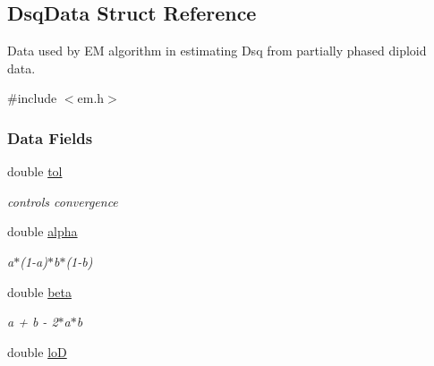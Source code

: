 \hypertarget{struct_dsq_data}{\subsection{\-Dsq\-Data \-Struct \-Reference}
\label{struct_dsq_data}
}


\-Data used by \-E\-M algorithm in estimating \-Dsq from partially phased diploid data.  




{\ttfamily \#include $<$em.\-h$>$}

\subsubsection*{\-Data \-Fields}
\begin{DoxyCompactItemize}
\item 
\hypertarget{struct_dsq_data_a2817fb4b70921ae3a9722c1fbf0f4a58}{double \hyperlink{struct_dsq_data_a2817fb4b70921ae3a9722c1fbf0f4a58}{tol}}\label{struct_dsq_data_a2817fb4b70921ae3a9722c1fbf0f4a58}

\begin{DoxyCompactList}\small\item\em controls convergence \end{DoxyCompactList}\item 
\hypertarget{struct_dsq_data_a40c3fdd276e9c89802f1173601460afc}{double \hyperlink{struct_dsq_data_a40c3fdd276e9c89802f1173601460afc}{alpha}}\label{struct_dsq_data_a40c3fdd276e9c89802f1173601460afc}

\begin{DoxyCompactList}\small\item\em a$\ast$(1-\/a)$\ast$b$\ast$(1-\/b) \end{DoxyCompactList}\item 
\hypertarget{struct_dsq_data_a9104819f67f85886818033b08e56cd5d}{double \hyperlink{struct_dsq_data_a9104819f67f85886818033b08e56cd5d}{beta}}\label{struct_dsq_data_a9104819f67f85886818033b08e56cd5d}

\begin{DoxyCompactList}\small\item\em a + b -\/ 2$\ast$a$\ast$b \end{DoxyCompactList}\item 
\hypertarget{struct_dsq_data_aa1b3a9ab84e0b900689f4f87939f93b5}{double \hyperlink{struct_dsq_data_aa1b3a9ab84e0b900689f4f87939f93b5}{lo\-D}}\label{struct_dsq_data_aa1b3a9ab84e0b900689f4f87939f93b5}


\end{DoxyCompactItemize}
